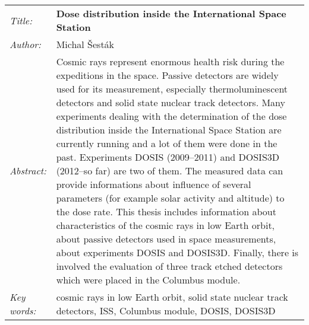 \begin{tabularx}{\textwidth}{>{\itshape}l X}
  Title: & \textbf{Dose distribution inside the International Space Station}\\
  Author: & Michal Šesták\\
  Abstract: & Cosmic rays represent enormous health risk during the expeditions in the space. Passive detectors are widely used for its measurement, especially thermoluminescent detectors and solid state nuclear track detectors. Many experiments dealing with the determination of the dose distribution inside the International Space Station are currently running and a lot of them were done in the past. Experiments DOSIS (2009--2011) and DOSIS3D (2012--so far) are two of them. The measured data can provide informations about influence of several parameters (for example solar activity and altitude) to the dose rate. This thesis includes information about characteristics of the cosmic rays in low Earth orbit, about passive detectors used in space measurements, about experiments DOSIS and
  DOSIS3D. Finally, there is involved the evaluation of three track etched detectors which were placed in the Columbus module.\\
  Key words: & cosmic rays in low Earth orbit, solid state nuclear track detectors, ISS, Columbus module, DOSIS, DOSIS3D
\end{tabularx}
\newpage 

